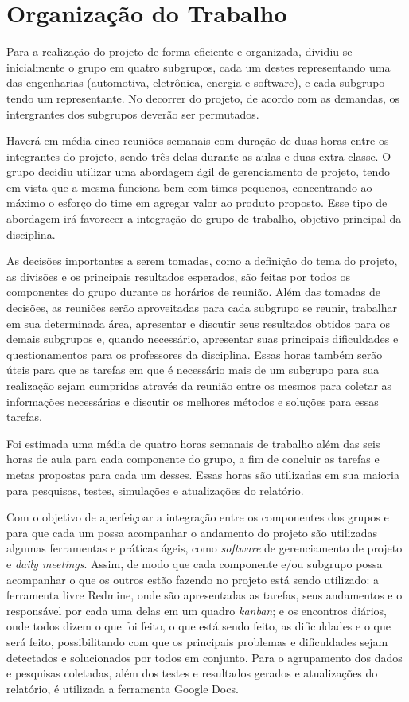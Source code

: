 \chapter[Organização do Trabalho]{Organização do Trabalho}

Para a realização do projeto de forma eficiente e organizada, dividiu-se inicialmente o grupo em quatro subgrupos, cada um destes representando uma das 
engenharias (automotiva, eletrônica, energia e software), e cada subgrupo tendo um representante. No decorrer do projeto, de acordo com as demandas, os 
intergrantes dos subgrupos deverão ser permutados. 

Haverá em média cinco reuniões semanais com duração de duas horas entre os integrantes do projeto, sendo três delas durante as aulas e duas extra classe.
O grupo decidiu utilizar uma abordagem ágil de gerenciamento de projeto, tendo em vista que a mesma funciona bem com times pequenos, concentrando ao máximo
o esforço do time em agregar valor ao produto proposto. Esse tipo de abordagem irá favorecer a integração do grupo de trabalho, objetivo principal da disciplina.

As decisões importantes a serem tomadas, como a definição do tema do projeto, as divisões e os principais resultados esperados, são feitas por 
todos os componentes do grupo durante os horários de reunião. Além das tomadas de decisões, as reuniões serão aproveitadas para cada subgrupo se reunir, 
trabalhar em sua determinada área, apresentar e discutir seus resultados obtidos para os demais subgrupos e, quando necessário, apresentar suas principais 
dificuldades e questionamentos para os professores da disciplina. Essas horas também serão úteis para que as tarefas em que é necessário mais de um subgrupo 
para sua realização sejam cumpridas através da reunião entre os mesmos para coletar as informações necessárias e discutir os melhores métodos e soluções para 
essas tarefas.

Foi estimada uma média de quatro horas semanais de trabalho além das seis horas de aula para cada componente do grupo, a fim de concluir as tarefas e metas 
propostas para cada um desses. Essas horas são utilizadas em sua maioria para pesquisas, testes, simulações e atualizações do relatório. 

Com o objetivo de aperfeiçoar a integração entre os componentes dos grupos e para que cada um possa acompanhar o andamento do projeto são utilizadas algumas 
ferramentas e práticas ágeis, como \textit{software} de gerenciamento de projeto e \textit{daily meetings}. Assim, de modo que cada componente e/ou subgrupo 
possa acompanhar o que os outros estão fazendo no projeto está sendo utilizado: a ferramenta livre Redmine, onde são apresentadas as tarefas, seus andamentos e o 
responsável por cada uma delas em um quadro \textit{kanban}; e os encontros diários, onde todos dizem o que foi feito, o que está sendo feito, as dificuldades
e o que será feito, possibilitando com que os principais problemas e dificuldades sejam detectados e solucionados por todos em conjunto. Para o agrupamento 
dos dados e pesquisas coletadas, além dos testes e resultados gerados e atualizações do relatório, é utilizada a ferramenta Google Docs.

